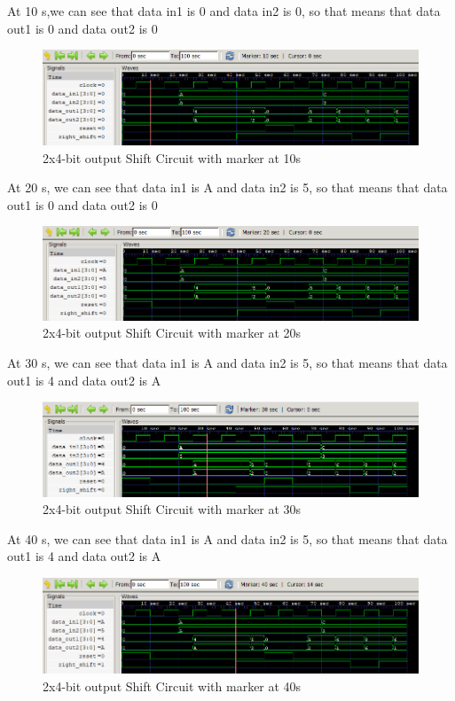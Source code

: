 \documentclass[12pt]{article}
\begin{document}
At 10 s,we can see that data in1 is 0 and data in2 is 0, so that means that data out1 is 0 and data out2 is 0
\begin{figure}[h]
    \centering
    \includegraphics[width = 1.0\textwidth]{figs/Shift10.png}
    \caption{2x4-bit output Shift Circuit with marker at 10s}
    \label{fig:enter-label}
\end{figure}

\newpage

At 20 s, we can see that data in1 is A and data in2 is 5, so that means that data out1 is 0 and data out2 is 0
\begin{figure}[h]
    \centering
    \includegraphics[width = 1.0\textwidth]{figs/Shift20.png}
    \caption{2x4-bit output Shift Circuit with marker at 20s}
    \label{fig:enter-label}
\end{figure}


At 30 s, we can see that data in1 is A and data in2 is 5, so that means that data out1 is 4 and data out2 is A
\begin{figure}[h]
    \centering
    \includegraphics[width = 1.0\textwidth]{figs/Shift30.png}
    \caption{2x4-bit output Shift Circuit with marker at 30s}
    \label{fig:enter-label}
\end{figure}


At 40 s, we can see that data in1 is A and data in2 is 5, so that means that data out1 is 4 and data out2 is A
\begin{figure}[h]
    \centering
    \includegraphics[width = 1.0\textwidth]{figs/Shift40.png}
    \caption{2x4-bit output Shift Circuit with marker at 40s}
    \label{fig:enter-label}
\end{figure}
\end{document}
